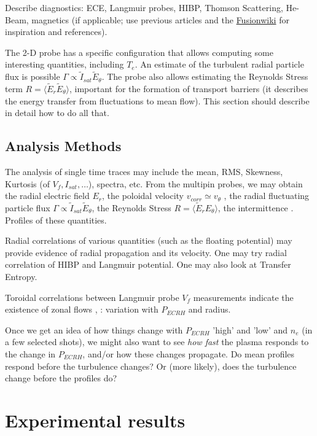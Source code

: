 \documentclass[preprint,12pt,authoryear]{elsarticle}
\begin{document}
Describe diagnostics: ECE, Langmuir probes, HIBP, Thomson Scattering, He-Beam, magnetics (if applicable; use previous articles and the \href{https://wiki.fusion.ciemat.es/wiki/TJ-II}{Fusionwiki} for inspiration and references).

The 2-D probe has a specific configuration that allows computing some interesting quantities, including $T_e$.
An estimate of the turbulent radial particle flux is possible $\Gamma \propto \tilde I_{sat} \tilde E_\theta$.
The probe also allows estimating the Reynolds Stress term $R = \langle \tilde E_r \tilde E_\theta \rangle$, important for the formation of transport barriers (it describes the energy transfer from fluctuations to mean flow).
This section should describe in detail how to do all that.

\subsection{Analysis Methods}

The analysis of single time traces may include the mean, RMS, Skewness, Kurtosis (of $V_f, I_{sat}, \dots$), spectra, etc. From the multipin probes, we may obtain the radial electric field $E_r$, the poloidal velocity $v_{corr} \simeq v_\theta$ \cite{Milligen:2023b}, the radial fluctuating particle flux $\Gamma \propto \tilde I_{sat} \tilde E_\theta$, the Reynolds Stress $R = \langle \tilde E_r E_\theta \rangle$, the intermittence \cite{Carreras:2020}. Profiles of these quantities. 

Radial correlations of various quantities (such as the floating potential) may provide evidence of radial propagation and its velocity. One may try radial correlation of HIBP and Langmuir potential. One may also look at Transfer Entropy.

Toroidal correlations between Langmuir probe $V_f$ measurements indicate the existence of zonal flows \cite{Pedrosa:2008}, \cite{Milligen:2015}: variation with $P_{ECRH}$ and radius.

Once we get an idea of how things change with $P_{ECRH}$ 'high' and 'low' and $n_e$ (in a few selected shots), we might also want to see {\em how fast} the plasma responds to the change in $P_{ECRH}$, and/or how these changes propagate. Do mean profiles respond before the turbulence changes? Or (more likely), does the turbulence change before the profiles do? 

\section{Experimental results}
\end{document}
